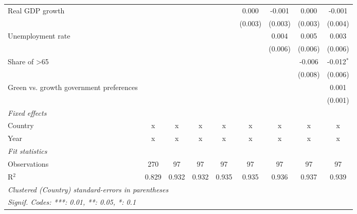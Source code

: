 \begin{table}[htbp]
\begin{tabular}{lcccccccc}
      Real GDP growth                                        &         &               &               &                & 0.000          & -0.001        & 0.000          & -0.001\\   
                                                             &         &               &               &                & (0.003)        & (0.003)       & (0.003)        & (0.004)\\   
      Unemployment rate                                      &         &               &               &                &                & 0.004         & 0.005          & 0.003\\   
                                                             &         &               &               &                &                & (0.006)       & (0.006)        & (0.006)\\   
      Share of >65                                           &         &               &               &                &                &               & -0.006         & -0.012$^{*}$\\   
                                                             &         &               &               &                &                &               & (0.008)        & (0.006)\\   
      Green vs. growth government preferences                &         &               &               &                &                &               &                & 0.001\\   
                                                             &         &               &               &                &                &               &                & (0.001)\\   
      \emph{Fixed effects}\\
      Country                                                & x       & x             & x             & x              & x              & x             & x              & x\\  
      Year                                                   & x       & x             & x             & x              & x              & x             & x              & x\\  
      \midrule \emph{Fit statistics}\\
      Observations                                           & 270     & 97            & 97            & 97             & 97             & 97            & 97             & 97\\  
      R$^2$                                                  & 0.829   & 0.932         & 0.932         & 0.935          & 0.935          & 0.936         & 0.937          & 0.939\\  
      \midrule
      \multicolumn{9}{l}{\emph{Clustered (Country) standard-errors in parentheses}}\\
      \multicolumn{9}{l}{\emph{Signif. Codes: ***: 0.01, **: 0.05, *: 0.1}}\\
   \end{tabular}
\end{table}


